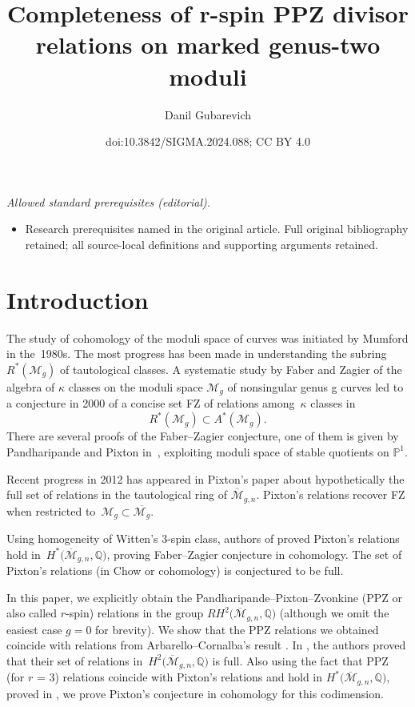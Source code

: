 \documentclass[10pt,a4paper]{amsart}
\title{Completeness of r-spin PPZ divisor relations on marked genus-two moduli}
\author{Danil Gubarevich}
\date{doi:10.3842/SIGMA.2024.088; CC BY 4.0}
\def\oM{\overline{\mathcal{M}}}
\numberwithin{equation}{section}
\begin{document}
\maketitle
\noindent\textit{Allowed standard prerequisites (editorial).}\begin{itemize}
\item Research prerequisites named in the original article. Full original bibliography retained; all source-local definitions and supporting arguments retained.
\end{itemize}\medskip
\section{Introduction}

The study of cohomology of the moduli space of curves was initiated by Mumford \cite{M} in the~1980s. The most progress has been made in understanding the subring $R^*(\mathcal{M}_{g})$ of tautological classes. A systematic study by Faber and Zagier of the algebra of $\kappa$ classes on the moduli space $\mathcal{M}_{g}$ of nonsingular genus g curves led to a conjecture in 2000 of a concise set FZ of relations among~$\kappa$ classes in
\[
R^*(\mathcal{M}_{g}) \subset A^*(\mathcal{M}_{g}).
\]
 There are several proofs of the Faber--Zagier conjecture, one of them is given by Pandharipande and Pixton in~\cite{PP}, exploiting moduli space of stable quotients on $\mathbb{P}^1$.

Recent progress in 2012 has appeared in Pixton's paper \cite{Pix} about hypothetically the full set of relations in the tautological ring of $\oM_{g,n}$. Pixton's relations recover FZ when restricted to~${\mathcal{M}_{g}\subset \overline{\mathcal{M}_{g}}}$.

Using homogeneity of Witten's 3-spin class,
authors of \cite{PPZ} proved Pixton's relations hold in~$H^*\big(\oM_{g,n},\mathbb{Q}\big)$, proving Faber--Zagier conjecture in cohomology.
The set of Pixton's relations (in Chow or cohomology) is conjectured to be full.

In this paper, we explicitly obtain the Pandharipande--Pixton--Zvonkine (PPZ or also called $r$-spin) relations \cite{PPZ,PPZ16} in the group $RH^2\big(\oM_{g,n},\mathbb{Q}\big)$
(although we omit the easiest case $g=0$ for brevity). We show that the PPZ relations we obtained coincide with relations from Arbarello--Cornalba's result \cite[Theorem 2.2]{Cor}. In \cite{Cor}, the authors proved that their set of relations in~$H^2\big(\oM_{g,n},\mathbb{Q}\big)$ is full. Also
using the fact that PPZ (for $r$ = 3) relations coincide with Pixton's relations and hold in $H^*\big(\oM_{g,n}, \mathbb{Q}\big)$, proved in \cite{PPZ}, we prove Pixton's conjecture in cohomology for this codimension.
\end{document}
